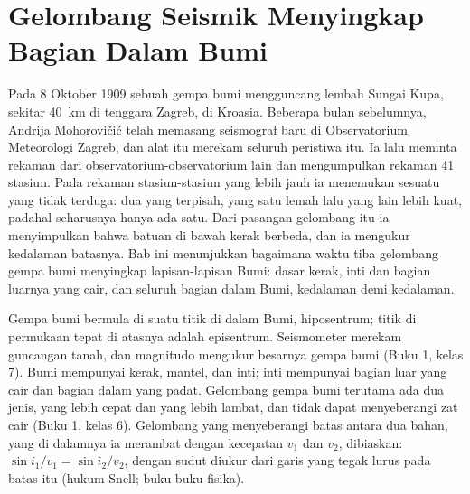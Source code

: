 \chapter{Gelombang Seismik Menyingkap Bagian Dalam Bumi}\label{ch:g11:seismic-structure}

Pada 8 Oktober 1909 sebuah gempa bumi mengguncang lembah Sungai Kupa, sekitar
\qty{40}{km} di tenggara Zagreb, di Kroasia. Beberapa bulan sebelumnya, Andrija
Mohorovičić telah memasang seismograf baru di Observatorium Meteorologi
Zagreb, dan alat itu merekam seluruh peristiwa itu. Ia lalu meminta rekaman
dari observatorium-observatorium lain dan mengumpulkan rekaman 41 stasiun. Pada
rekaman stasiun-stasiun yang lebih jauh ia menemukan sesuatu yang tidak
terduga: dua  yang terpisah, yang satu lemah lalu yang lain lebih
kuat, padahal seharusnya hanya ada satu. Dari pasangan gelombang itu ia
menyimpulkan bahwa batuan di bawah kerak berbeda, dan ia mengukur kedalaman
batasnya. Bab ini menunjukkan bagaimana waktu tiba gelombang gempa bumi
menyingkap lapisan-lapisan Bumi: dasar kerak, inti dan bagian luarnya yang cair,
dan seluruh bagian dalam Bumi, kedalaman demi kedalaman.

\begin{recall}
Gempa bumi bermula di suatu titik di dalam Bumi, hiposentrum; titik di
permukaan tepat di atasnya adalah episentrum. Seismometer merekam guncangan
tanah, dan magnitudo mengukur besarnya gempa bumi (Buku 1, kelas 7). Bumi
mempunyai kerak, mantel, dan inti; inti mempunyai bagian luar yang cair dan
bagian dalam yang padat. Gelombang gempa bumi terutama ada dua jenis,
 yang lebih cepat dan  yang lebih lambat, dan 
tidak dapat menyeberangi zat cair (Buku 1, kelas 6). Gelombang yang
menyeberangi batas antara dua bahan, yang di dalamnya ia merambat dengan
kecepatan $v_1$ dan $v_2$, dibiaskan:
$\sin i_1/v_1 = \sin i_2/v_2$, dengan sudut diukur dari garis yang tegak lurus
pada batas itu (hukum Snell; buku-buku fisika).
\end{recall}

